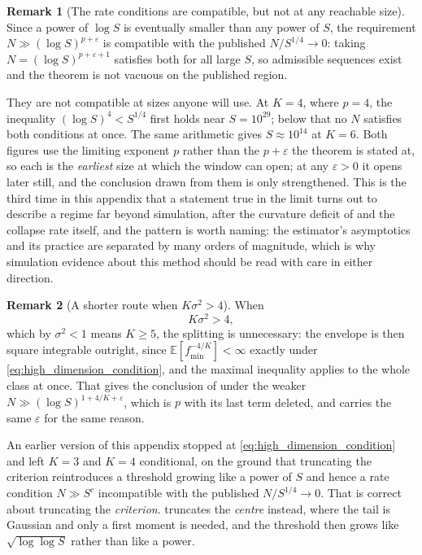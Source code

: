 \documentclass[11pt]{article}
\theoremstyle{definition}
\newtheorem{remark}[remark]{Remark}
\newcommand{\E}{\mathbb{E}}
\begin{document}
\begin{remark}[The rate conditions are compatible, but not at any reachable size]\label{rem:window}
Since a power of $\log S$ is eventually smaller than any power of $S$, the requirement $N\gg(\log S)^{p+\varepsilon}$ is compatible with the published $N/S^{1/4}\to0$: taking $N=(\log S)^{p+\varepsilon+1}$ satisfies both for all large $S$, so admissible sequences exist and the theorem is not vacuous on the published region.

They are not compatible at sizes anyone will use. At $K=4$, where $p=4$, the inequality $(\log S)^4<S^{1/4}$ first holds near $S=10^{29}$; below that no $N$ satisfies both conditions at once. The same arithmetic gives $S\approx10^{14}$ at $K=6$. Both figures use the limiting exponent $p$ rather than the $p+\varepsilon$ the theorem is stated at, so each is the \emph{earliest} size at which the window can open; at any $\varepsilon>0$ it opens later still, and the conclusion drawn from them is only strengthened. This is the third time in this appendix that a statement true in the limit turns out to describe a regime far beyond simulation, after the curvature deficit of  and the collapse rate itself, and the pattern is worth naming: the estimator's asymptotics and its practice are separated by many orders of magnitude, which is why simulation evidence about this method should be read with care in either direction.
\end{remark}

\begin{remark}[A shorter route when $K\sigma^2>4$]\label{rem:high_dimension_route}
When
\begin{equation}\label{eq:high_dimension_condition}
K\sigma^2>4 ,
\end{equation}
which by $\sigma^2<1$ means $K\ge5$, the splitting is unnecessary: the envelope is then square integrable outright, since $\E[f_{\min}^{-4/K}]<\infty$ exactly under \eqref{eq:high_dimension_condition}, and the maximal inequality applies to the whole class at once. That gives the conclusion of  under the weaker $N\gg(\log S)^{1+4/K+\varepsilon}$, which is $p$ with its last term deleted, and carries the same $\varepsilon$ for the same reason.

\end{remark}

An earlier version of this appendix stopped at \eqref{eq:high_dimension_condition} and left $K=3$ and $K=4$ conditional, on the ground that truncating the criterion reintroduces a threshold growing like a power of $S$ and hence a rate condition $N\gg S^{c}$ incompatible with the published $N/S^{1/4}\to0$. That is correct about truncating the \emph{criterion}.  truncates the \emph{centre} instead, where the tail is Gaussian and only a first moment is needed, and the threshold then grows like $\sqrt{\log\log S}$ rather than like a power.
\end{document}
